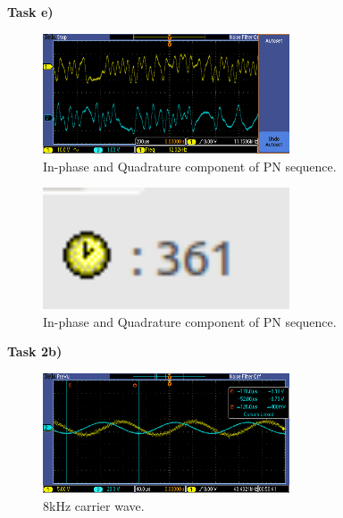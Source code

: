 \documentclass{article}
\begin{document}
\pagebreak
\textbf{Task e)}

\begin{figure}[h]
  \begin{center}
    \includegraphics[width=0.65\textwidth]{img/task_e_oscilloscope.png}
    \caption{In-phase and Quadrature component of PN sequence.}
  \end{center}
\end{figure}

\begin{figure}[h]
  \begin{center}
    \includegraphics[width=0.65\textwidth]{img/task_e_profile.png}
    \caption{In-phase and Quadrature component of PN sequence.}
  \end{center}
\end{figure}

\pagebreak

\pagebreak
\textbf{Task 2b)}

\begin{figure}[h]
  \begin{center}
    \includegraphics[width=0.65\textwidth]{img/task_2_b_oscilloscope.png}
    \caption{8kHz carrier wave.}
  \end{center}
\end{figure}
\end{document}
